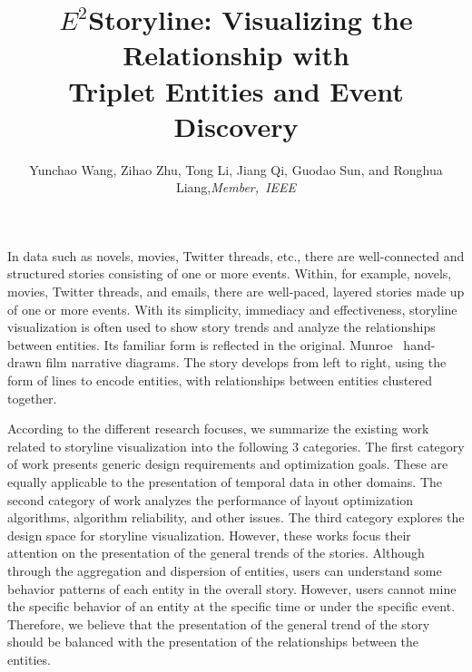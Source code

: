 \documentclass[review,journal]{vgtc}         %
\title{$E^2$Storyline: Visualizing the Relationship with\\ Triplet Entities and Event Discovery}
\author{Yunchao Wang, Zihao Zhu, Tong Li, Jiang Qi, Guodao Sun, and Ronghua Liang,\textit{Member,~IEEE}}
\begin{document}


\maketitle
\noindent In data such as novels, movies, Twitter threads, etc., there are well-connected and structured stories consisting of one or more events. Within, for example, novels, movies, Twitter threads, and emails, there are well-paced, layered stories made up of one or more events.
With its simplicity, immediacy and effectiveness, storyline visualization is often used to show story trends and analyze the relationships between entities. Its familiar form is reflected in the original. 
Munroe~\cite{munroe_movie_nodate} hand-drawn film narrative diagrams. The story develops from left to right, using the form of lines to encode entities, with relationships between entities clustered together.

According to the different research focuses, we summarize the existing work related to storyline visualization into the following 3 categories. The first category of work presents generic design requirements and optimization goals. These are equally applicable to the presentation of temporal data in other domains. The second category of work analyzes the performance of layout optimization algorithms, algorithm reliability, and other issues. The third category explores the design space for storyline visualization. However, these works focus their attention on the presentation of the general trends of the stories. Although through the aggregation and dispersion of entities, users can understand some behavior patterns of each entity in the overall story.
However, users cannot mine the specific behavior of an entity at the specific time or under the specific event. Therefore, we believe that the presentation of the general trend of the story should be balanced with the presentation of the relationships between the entities.
\end{document}
